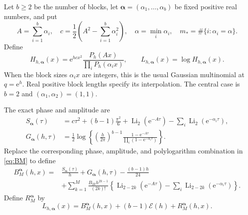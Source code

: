 \documentclass[11pt,a4paper]{article}
\newcommand{\ee}{\mathrm e}
\newcommand{\Li}{\operatorname{Li}}
\newcommand{\E}{\mathcal E}
\numberwithin{equation}{section}
\theoremstyle{plain}
\theoremstyle{definition}
\theoremstyle{remark}
\begin{document}
Let $b\ge2$ be the number of blocks, let
$\boldsymbol\alpha=(\alpha_1,\ldots,\alpha_b)$ be fixed positive real
numbers, and put
\begin{equation}
 A=\sum_{i=1}^b\alpha_i,\quad
 c=\frac12\left(A^2-\sum_{i=1}^b\alpha_i^2\right),\quad
 \alpha=\min_i\alpha_i,\quad m_* =\#\{i:\alpha_i=\alpha\}.
 \label{eq:alphas}
\end{equation}
Define
\begin{equation}
 H_{h,\boldsymbol\alpha}(x)=\ee^{hc x^2}
                   \frac{P_h(Ax)}{\prod_iP_h(\alpha_i x)},\qquad
 L_{h,\boldsymbol\alpha}(x)=\log H_{h,\boldsymbol\alpha}(x).
 \label{eq:multidef}
\end{equation}
When the block sizes $\alpha_i x$ are integers, this is the usual Gaussian
multinomial at $q=\ee^h$. Real positive block lengths specify its interpolation.
The central case is $b=2$ and $(\alpha_1,\alpha_2)=(1,1)$.

The exact phase and amplitude are
\begin{align}
 S_{\boldsymbol\alpha}(\tau)
 &=c\tau^2+(b-1)\frac{\pi^2}{6}
       +\Li_2(\ee^{-A\tau})-\sum_i\Li_2(\ee^{-\alpha_i\tau}),
       \label{eq:multiS}\\
 G_{\boldsymbol\alpha}(h,\tau)
 &=\frac12\log\left\{
  \left(\frac h{2\pi}\right)^{b-1}
   \frac{1-\ee^{-A\tau}}{\prod_i(1-\ee^{-\alpha_i\tau})}\right\}.
       \label{eq:multiG}
\end{align}
Replace the corresponding phase, amplitude, and polylogarithm combination in
\eqref{eq:BM} to define
\begin{align}
 B_M^{\boldsymbol\alpha}(h,x)
 ={}&\frac{S_{\boldsymbol\alpha}(\tau)}h+
 G_{\boldsymbol\alpha}(h,\tau)-\frac{(b-1)h}{24}\nonumber\\
 &+\sum_{k=1}^{M}\frac{B_{2k}h^{2k-1}}{(2k)!}
 \left\{\Li_{2-2k}(\ee^{-A\tau})-
                        \sum_i\Li_{2-2k}(\ee^{-\alpha_i\tau})\right\}.
 \label{eq:multiB}
\end{align}
Define $R_M^{\boldsymbol\alpha}$ by
\begin{equation}
 L_{h,\boldsymbol\alpha}(x)=B_M^{\boldsymbol\alpha}(h,x)
                    +(b-1)\E(h)+R_M^{\boldsymbol\alpha}(h,x).
 \label{eq:multiRdef}
\end{equation}
\end{document}
